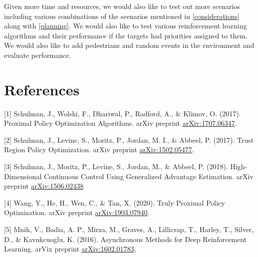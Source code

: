 \documentclass{article}
\begin{document}
    Given more time and resources, we would also like to test out more scenarios including various combinations of the scenarios mentioned in \ref{considerations} along with \ref{planning}. We would also like to test various reinforcement learning algorithms and their performance if the targets had priorities assigned to them. We would also like to add pedestrians and random events in the environment and evaluate performance.
    
    \section*{References}
    
    
    [1] Schulman, J., Wolski, F., Dhariwal, P., Radford, A., \& Klimov, O. (2017). Proximal Policy Optimization Algorithms. arXiv preprint \href{https://arxiv.org/abs/1707.06347}{arXiv:1707.06347}.
    
    [2] Schulman, J., Levine, S., Moritz, P., Jordan, M. I., \& Abbeel, P. (2017). Trust Region Policy Optimization. arXiv preprint \href{https://arxiv.org/abs/1502.05477}{arXiv:1502.05477}.
    
    [3] Schulman, J., Moritz, P., Levine, S., Jordan, M., \& Abbeel, P. (2018). High-Dimensional Continuous Control Using Generalized Advantage Estimation. arXiv preprint \href{https://arxiv.org/abs/1506.02438}{arXiv:1506.02438}
    
    [4] Wang, Y., He, H., Wen, C., \& Tan, X. (2020). Truly Proximal Policy Optimization. arXiv preprint \href{https://arxiv.org/abs/1903.07940}{arXiv:1903.07940}.
    
    [5] Mnih, V., Badia, A. P., Mirza, M., Graves, A., Lillicrap, T., Harley, T., Silver, D., & Kavukcuoglu, K. (2016). Asynchronous Methods for Deep Reinforcement Learning. arVix preprint \href{https://arxiv.org/abs/1602.01783}{arXiv:1602.01783},
\end{document}
